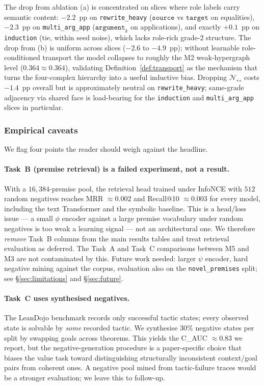 \documentclass[11pt]{article}
\theoremstyle{definition}
\theoremstyle{plain}
\newcommand{\role}[1]{\texttt{#1}}
\begin{document}
\medskip
\noindent The drop from ablation (a) is concentrated on slices where role
labels carry semantic content: $-2.2$~pp on \texttt{rewrite\_heavy}
($\role{source}$ vs $\role{target}$ on equalities), $-2.3$~pp on
\texttt{multi\_arg\_app} ($\role{argument}_k$ on applications), and exactly
$+0.1$~pp on \texttt{induction} (tie, within seed noise), which lacks
role-rich grade-$2$ structure. The drop from (b) is uniform across slices
($-2.6$ to $-4.9$~pp); without learnable role-conditioned transport the
model collapses to roughly the M2 weak-hypergraph level
($0.364 \approx 0.364$), validating Definition~\ref{def:transport} as the
mechanism that turns the four-complex hierarchy into a useful inductive
bias. Dropping $\mathcal{N}_{\leftrightarrow}$ costs $-1.4$~pp overall but
is approximately neutral on \texttt{rewrite\_heavy}; same-grade adjacency
via shared face is load-bearing for the \texttt{induction} and
\texttt{multi\_arg\_app} slices in particular.

\subsubsection*{Empirical caveats}\label{subsec:results-caveats}

We flag four points the reader should weigh against the headline.

\paragraph{Task~B (premise retrieval) is a failed experiment, not a result.}
With a $16{,}384$-premise pool, the retrieval head trained under InfoNCE
with $512$ random negatives reaches MRR $\approx 0.002$ and Recall@10
$\approx 0.003$ for every model, including the text Transformer and the
symbolic baseline. This is a head/loss issue — a small $\phi$ encoder
against a large premise vocabulary under random negatives is too weak a
learning signal — not an architectural one. We therefore \emph{remove}
Task~B columns from the main results tables and treat retrieval evaluation
as deferred. The Task~A and Task~C comparisons between M5 and M3 are not
contaminated by this. Future work needed: larger $\psi$ encoder, hard
negative mining against the corpus, evaluation also on the
\texttt{novel\_premises} split; see \S\ref{sec:limitations} and
\S\ref{sec:future}.

\paragraph{Task~C uses synthesised negatives.}
The LeanDojo benchmark records only successful tactic states; every
observed state is solvable by \emph{some} recorded tactic. We synthesise
$30\%$ negative states per split by swapping goals across theorems. This
yields the C\_AUC $\approx 0.83$ we report, but the negative-generation
procedure is a paper-specific choice that biases the value task toward
distinguishing structurally inconsistent context/goal pairs from coherent
ones. A negative pool mined from tactic-failure traces would be a stronger
evaluation; we leave this to follow-up.
\end{document}
